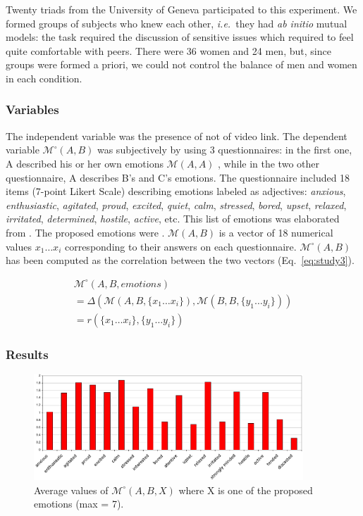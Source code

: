 \documentclass[twocolumn]{article}
\newcommand{\ie}{{\textit{i.e.\ }}}
\newcommand{\M}[3]{{\mathcal{M}(#1, #2, #3)}}
\newcommand{\gmodel}[2]{{$\mathcal{M}(#1, #2)$}}
\newcommand{\Model}[3]{{$\mathcal{M}^{\circ}(#1, #2, #3)$}}
\newcommand{\gModel}[2]{{$\mathcal{M}^{\circ}(#1, #2)$}}
\newcommand{\Mdeg}[3]{{\mathcal{M}^{\circ}(#1, #2, #3)}}
\begin{document}
Twenty triads from the University of Geneva participated to this experiment. We
formed groups of subjects who knew each other, \ie they had \emph{ab initio}
mutual models: the task required the discussion of sensitive issues which
required to feel quite comfortable with peers. There were 36 women and 24 men,
but, since groups were formed a priori, we could not control the balance of men
and women in each condition.

\subsubsection*{Variables}

The independent variable was the presence of not of video link. The dependent
variable \gModel{A}{B} was subjectively by using 3 questionnaires: in the first
one, A described his or her own emotions \gmodel{A}{A} , while in the two other
questionnaire, A describes B's and C's emotions. The questionnaire included 18
items (7-point Likert Scale) describing emotions labeled as adjectives:
\emph{anxious}, \emph{enthusiastic}, \emph{agitated}, \emph{proud},
\emph{excited}, \emph{quiet}, \emph{calm}, \emph{stressed}, \emph{bored},
\emph{upset}, \emph{relaxed}, \emph{irritated}, \emph{determined},
\emph{hostile}, \emph{active}, etc. This list of emotions was
elaborated from . The proposed emotions were . \gmodel{A}{B} is a vector
of 18 numerical values ${x_1 \dots x_i}$ corresponding to their answers on each
questionnaire. \gModel{A}{B} has been computed as the correlation between the
two vectors (Eq.~\ref{eq:study3}).

\begin{multline} \label{eq:study3}
    \Mdeg{A}{B}{emotions}\\
    = \Delta(\M{A}{B}{\{x_1 \dots x_i\}}, \M{B}{B}{\{y_1 \dots y_i\}}) \\ 
    = r(\{x_1 \dots x_i\}, \{y_1 \dots y_i\})
\end{multline}

\subsubsection*{Results}

\begin{figure}[ht!]
        \centering
        \includegraphics[width=0.9\textwidth]{image9.pdf}
        \caption{Average values of \Model{A}{B}{X} where X is one of the proposed
        emotions (max = 7).}
        \label{study3:deg_m_values}
\end{figure}
\end{document}
